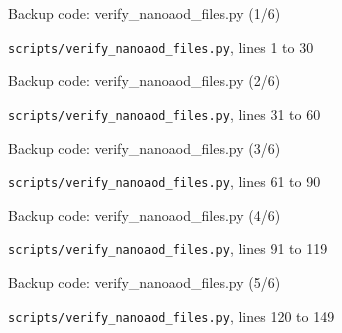 \begin{frame}{Backup code: verify\_nanoaod\_files.py (1/6)}
  \vspace{0pt}\par
  {\tiny\color{lightgrey}\texttt{scripts/verify\_nanoaod\_files.py}, lines 1 to 30\par}
  
\end{frame}
\begin{frame}{Backup code: verify\_nanoaod\_files.py (2/6)}
  \vspace{0pt}\par
  {\tiny\color{lightgrey}\texttt{scripts/verify\_nanoaod\_files.py}, lines 31 to 60\par}
  
\end{frame}
\begin{frame}{Backup code: verify\_nanoaod\_files.py (3/6)}
  \vspace{0pt}\par
  {\tiny\color{lightgrey}\texttt{scripts/verify\_nanoaod\_files.py}, lines 61 to 90\par}
  
\end{frame}
\begin{frame}{Backup code: verify\_nanoaod\_files.py (4/6)}
  \vspace{0pt}\par
  {\tiny\color{lightgrey}\texttt{scripts/verify\_nanoaod\_files.py}, lines 91 to 119\par}
  
\end{frame}
\begin{frame}{Backup code: verify\_nanoaod\_files.py (5/6)}
  \vspace{0pt}\par
  {\tiny\color{lightgrey}\texttt{scripts/verify\_nanoaod\_files.py}, lines 120 to 149\par}
  
\end{frame}
